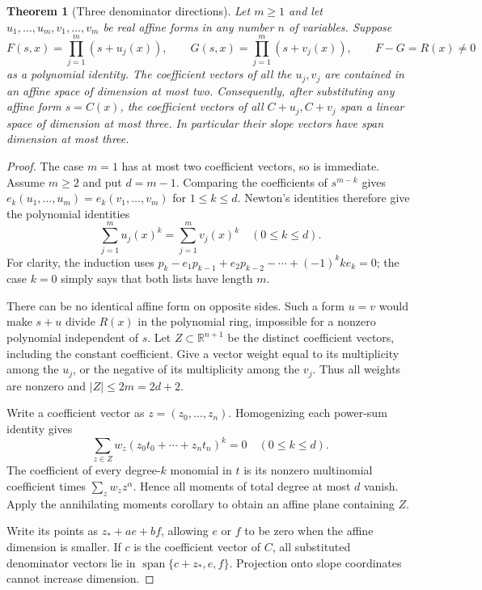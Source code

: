 \documentclass[11pt]{article}
\newtheorem{theorem}{Theorem}
\begin{document}
\begin{theorem}[Three denominator directions]
Let $m\ge1$ and let $u_1,\ldots,u_m,v_1,\ldots,v_m$ be real affine
forms in any number $n$ of variables. Suppose
\[
 F(s,x)=\prod_{j=1}^m(s+u_j(x)),\qquad
 G(s,x)=\prod_{j=1}^m(s+v_j(x)),\qquad F-G=R(x)\ne0
\]
as a polynomial identity. The coefficient vectors of all the $u_j,v_j$
are contained in an affine space of dimension at most two. Consequently,
after substituting any affine form $s=C(x)$, the coefficient vectors
of all $C+u_j,C+v_j$ span a linear space of dimension at most three.
In particular their slope vectors have span dimension at most three.
\end{theorem}
\begin{proof}
The case $m=1$ has at most two coefficient vectors, so is immediate.
Assume $m\ge2$ and put $d=m-1$.
Comparing the coefficients of $s^{m-k}$ gives
$e_k(u_1,\ldots,u_m)=e_k(v_1,\ldots,v_m)$ for $1\le k\le d$.
Newton's identities therefore give the polynomial identities
\[
 \sum_{j=1}^m u_j(x)^k=\sum_{j=1}^m v_j(x)^k
 \quad (0\le k\le d).
\]
For clarity, the induction uses
$p_k-e_1p_{k-1}+e_2p_{k-2}-\cdots+(-1)^k k e_k=0$;
the case $k=0$ simply says that both lists have length $m$.

There can be no identical affine form on opposite sides. Such a form
$u=v$ would make $s+u$ divide $R(x)$ in the polynomial ring, impossible
for a nonzero polynomial independent of $s$.
Let $Z\subset\mathbb R^{n+1}$ be the distinct coefficient vectors,
including the constant coefficient. Give a vector weight equal to its
multiplicity among the $u_j$, or the negative of its multiplicity among
the $v_j$. Thus all weights are nonzero and $|Z|\le2m=2d+2$.

Write a coefficient vector as $z=(z_0,\ldots,z_n)$.
Homogenizing each power-sum identity gives
\[
 \sum_{z\in Z}w_z(z_0t_0+\cdots+z_nt_n)^k=0
 \quad (0\le k\le d).
\]
The coefficient of every degree-$k$ monomial in $t$ is its nonzero
multinomial coefficient times $\sum_z w_z z^\alpha$. Hence all
moments of total degree at most $d$ vanish. Apply the annihilating
moments corollary to obtain an affine plane containing $Z$.

Write its points as $z_\ast+a e+b f$, allowing $e$ or $f$ to be
zero when the affine dimension is smaller. If $c$ is the coefficient
vector of $C$, all substituted denominator vectors lie in
$\operatorname{span}\{c+z_\ast,e,f\}$. Projection onto slope
coordinates cannot increase dimension.
\end{proof}
\end{document}
